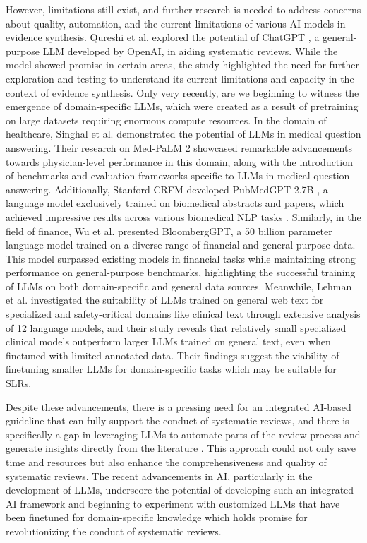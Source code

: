 \documentclass{article}
\begin{document}
However, limitations still exist, and further research is needed to address concerns about quality, automation, and the current limitations of various AI models in evidence synthesis. Qureshi et al. \cite{qureshi2023chatgpt} explored the potential of ChatGPT \cite{openai}, a general-purpose LLM developed by OpenAI, in aiding systematic reviews. While the model showed promise in certain areas, the study highlighted the need for further exploration and testing to understand its current limitations and capacity in the context of evidence synthesis. Only very recently, are we beginning to witness the emergence of domain-specific LLMs, which were created as a result of pretraining on large datasets requiring enormous compute resources. In the domain of healthcare, Singhal et al. \cite{singhal2022large, singhal2023towards} demonstrated the potential of LLMs in medical question answering. Their research on Med-PaLM 2 showcased remarkable advancements towards physician-level performance in this domain, along with the introduction of benchmarks and evaluation frameworks specific to LLMs in medical question answering. Additionally, Stanford CRFM developed PubMedGPT 2.7B \cite{bolton2022stanford}, a language model exclusively trained on biomedical abstracts and papers, which achieved impressive results across various biomedical NLP tasks \cite{bolton2022stanford}. Similarly, in the field of finance, Wu et al. \cite{wu2023bloomberggpt} presented BloombergGPT, a 50 billion parameter language model trained on a diverse range of financial and general-purpose data. This model surpassed existing models in financial tasks while maintaining strong performance on general-purpose benchmarks, highlighting the successful training of LLMs on both domain-specific and general data sources. Meanwhile, Lehman et al. \cite{lehman2023we} investigated the suitability of LLMs trained on general web text for specialized and safety-critical domains like clinical text through extensive analysis of 12 language models, and their study reveals that relatively small specialized clinical models outperform larger LLMs trained on general text, even when finetuned with limited annotated data. Their findings suggest the viability of finetuning smaller LLMs for domain-specific tasks which may be suitable for SLRs.

Despite these advancements, there is a pressing need for an integrated AI-based guideline that can fully support the conduct of systematic reviews, and there is specifically a gap in leveraging LLMs to automate parts of the review process and generate insights directly from the literature \cite{Brown2020}. This approach could not only save time and resources but also enhance the comprehensiveness and quality of systematic reviews. The recent advancements in AI, particularly in the development of LLMs, underscore the potential of developing such an integrated AI framework and beginning to experiment with customized LLMs that have been finetuned for domain-specific knowledge which holds promise for revolutionizing the conduct of systematic reviews.
\end{document}

